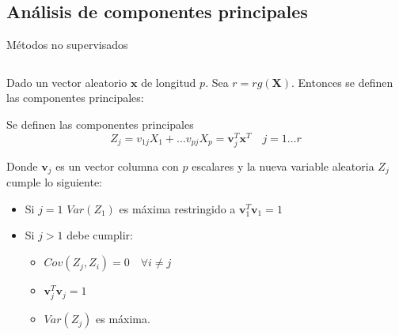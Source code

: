 \subsection{Análisis de componentes principales}
\begin{frame}{Métodos no supervisados}
\begin{columns}
\begin{column}{0.9\textwidth}
Dado un vector aleatorio $\mathbf{x}$ de longitud $p$. Sea $r=rg(\mathbf{X})$. Entonces se definen las componentes principales:
\begin{defi}
Se definen las componentes principales 
\begin{equation}
Z_j=v_{1j}X_1+\ldots v_{pj}X_p=\mathbf{v}_j^T\mathbf{x}^T \quad j=1\ldots r
\end{equation}

\noindent Donde $\textbf{v}_j$ es un vector columna con $p$ escalares y la nueva variable aleatoria $Z_j$ cumple lo siguiente:
\begin{itemize}
\item Si $j=1$ $Var(Z_1)$ es máxima restringido a $\mathbf{v}_1^T \mathbf{v}_1=1$
\item Si $j>1$ debe cumplir:
\begin{itemize}
\item $Cov(Z_j,Z_i)=0\quad \forall i\neq j $
\item $\textbf{v}_j^T \textbf{v}_j=1$
\item $Var(Z_j)$ es máxima. 
\end{itemize}
\end{itemize}
\end{defi}
\end{column}
\end{columns}
\end{frame}


